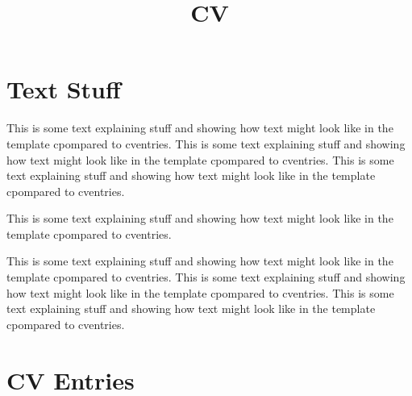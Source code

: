 \documentclass[10pt,a4paper, sans]{moderncv}
\title{CV}
\begin{document}
 
\maketitle 
\vspace{-1em}
\hrulefill
\vspace{1em}

\setlength{\parskip}{1em plus3em minus0.5em}


\marginparsep=-2.5cm
\marginparwidth=2.5cm
\reversemarginpar

\section{Text Stuff}

\begin{changemargin}{3cm}{0cm} 
This is some text explaining stuff and showing how text might look like in the template cpompared to cventries. This is some text explaining stuff and showing how text might look like in the template cpompared to cventries. This is some text explaining stuff and showing how text might look like in the template cpompared to cventries.  

This is some text explaining stuff and showing how text might look like in the template cpompared to cventries. 

This is some text explaining stuff and showing how text might look like in the template cpompared to cventries. This is some text explaining stuff and showing how text might look like in the template cpompared to cventries. This is some text explaining stuff and showing how text might look like in the template cpompared to cventries. 

\end{changemargin}


\section{CV Entries}


\end{document}
